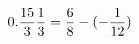 \documentclass[preview]{standalone}
\begin{document}
\begin{align*}
\special{dvisvgm:raw <g id='unique000'>}0.\frac{15}{3} \frac{1}{3} = \frac{6}{8} - (- \frac{1}{12})\special{dvisvgm:raw </g>}
\end{align*}
\end{document}
